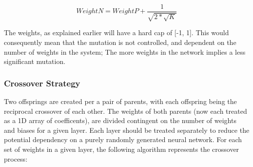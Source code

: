 \documentclass[12pt,a4paper]{article}
\begin{document}
    $$ WeightN = WeightP + \frac{1}{\sqrt{2 * \sqrt{K} }}$$

    The weights, as explained earlier will have a hard cap of [-1, 1]. This would consequently mean that the mutation is not controlled, and dependent on the number of weights in the system; The more weights in the network implies a less significant mutation.

\subsubsection{Crossover Strategy}

    Two offsprings are created per a pair of parents, with each offspring being the reciprocal crossover of each other. The weights of both parents (now each treated as a 1D array of coefficents), are divided contingent on the number of weights and biases for a given layer. Each layer should be treated separately to reduce the potential dependency on a purely randomly generated neural network. For each set of weights in a given layer, the following algorithm represents the crossover process:

        
\end{document}
